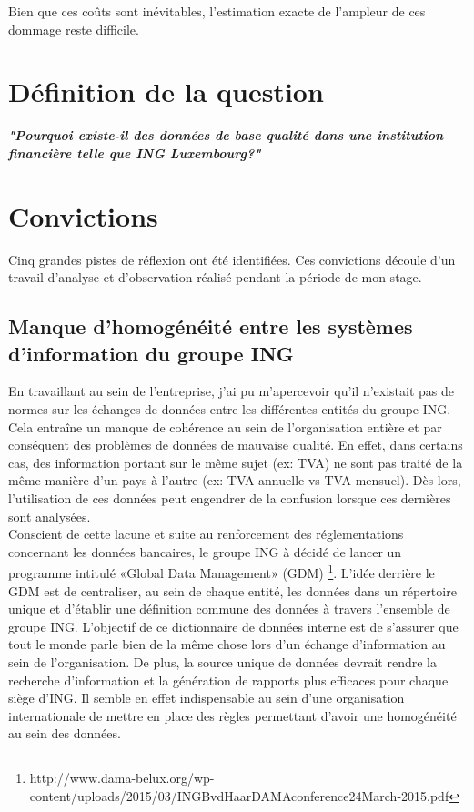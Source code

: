\documentclass[a4paper, 12pt, french]{article}
\begin{document}
Bien que ces coûts sont inévitables, l'estimation exacte de l'ampleur de ces dommage reste difficile. 

\section{Définition de la question}

\begin{center}
\textit{\textbf{"Pourquoi existe-il des données de base qualité dans une institution financière telle que ING Luxembourg?"}}
\end{center}

\section{Convictions}

Cinq grandes pistes de réflexion ont été identifiées. Ces convictions découle d’un travail d’analyse et d’observation réalisé pendant la période de mon stage.

\subsection{Manque d'homogénéité entre les systèmes d’information du groupe ING}

En travaillant au sein de l'entreprise, j'ai pu m'apercevoir qu'il n'existait pas de normes sur les échanges de données entre les différentes entités du groupe ING. Cela entraîne un manque de cohérence au sein de l’organisation entière et par conséquent des problèmes de données de mauvaise qualité. En effet, dans certains cas, des information portant sur le même sujet (ex: TVA) ne sont pas traité de la même manière d'un pays à l'autre (ex: TVA annuelle vs TVA mensuel). Dès lors, l'utilisation de ces données peut engendrer de la confusion lorsque ces dernières sont analysées. \\

Conscient de cette lacune et suite au renforcement des réglementations concernant les données bancaires, le groupe ING à décidé de lancer un programme intitulé «Global Data Management» (GDM) \footnote{http://www.dama-belux.org/wp-content/uploads/2015/03/INGBvdHaarDAMAconference24March-2015.pdf}. L'idée derrière le GDM est de centraliser, au sein de chaque entité, les données dans un répertoire unique et d'établir une définition commune des données à travers l’ensemble de groupe ING. L’objectif de ce dictionnaire de données interne est de s’assurer que tout le monde parle bien de la même chose lors d’un échange d’information au sein de l'organisation. De plus, la source unique de données devrait rendre la recherche d'information et la génération de rapports plus efficaces pour chaque siège d'ING. Il semble en effet indispensable au sein d'une organisation internationale de mettre en place des règles permettant d'avoir une homogénéité au sein des données. \\
\end{document}
